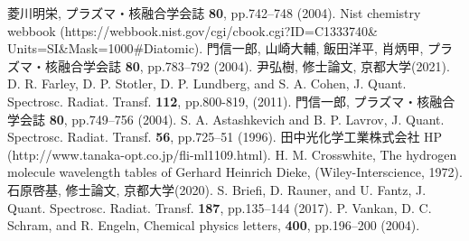 \begin{thebibliography}{99}
     菱川明栄, プラズマ・核融合学会誌 \textbf{80}, pp.742–748 (2004).
     Nist chemistry webbook (https://webbook.nist.gov/cgi/cbook.cgi?ID=C1333740\&\\Units=SI\&Mask=1000\#Diatomic).
     門信一郎, 山崎大輔, 飯田洋平, 肖炳甲, プラズマ・核融合学会誌 \textbf{80}, pp.783–792 (2004).
     尹弘樹, 修士論文, 京都大学(2021).
     D. R. Farley, D. P. Stotler, D. P. Lundberg, and S. A. Cohen, J. Quant. Spectrosc. Radiat. Transf. \textbf{112}, pp.800-819, (2011).
     門信一郎, プラズマ・核融合学会誌 \textbf{80}, pp.749–756 (2004).
     S. A. Astashkevich and B. P. Lavrov, J. Quant. Spectrosc. Radiat. Transf. \textbf{56}, pp.725–51 (1996).
     田中光化学工業株式会社 HP (http://www.tanaka-opt.co.jp/fli-ml1109.html).
     H. M. Crosswhite, The hydrogen molecule wavelength tables of Gerhard Heinrich Dieke, (Wiley-Interscience, 1972).
     石原啓基, 修士論文, 京都大学(2020).
     S. Briefi, D. Rauner, and U. Fantz, J. Quant. Spectrosc. Radiat. Transf. \textbf{187}, pp.135–144 (2017).
     P. Vankan, D. C. Schram, and R. Engeln, Chemical physics letters, \textbf{400}, pp.196–200 (2004).
\end{thebibliography}